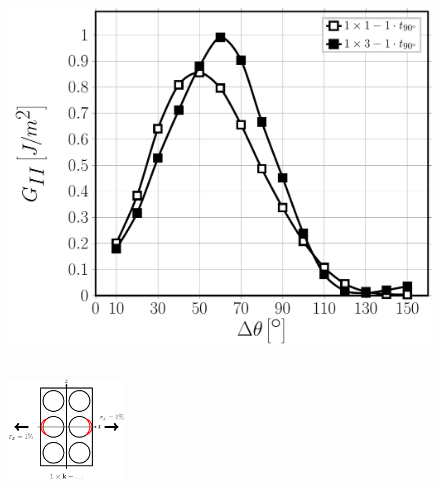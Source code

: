 \documentclass[first,firstsupp,lastsupp,last,hyperref,table]{ETHclass}
\begin{document}
\begin{frame}
\begin{columns}[c]
\begin{column}{0.5\textwidth}
\begin{figure}
\includegraphics[width=\columnwidth]{nxk-1-vf60-GII-strainmagni1.pdf}
\end{figure}
\end{column}
\end{columns}
\vspace{-0.25cm}
\centering
\begin{figure}
\centering
\includegraphics[width=0.275\textwidth]{twofibers-sameside-strainmagni1.pdf}
\end{figure}
\end{frame}

\addtocounter{framenumber}{-1}
\end{document}
